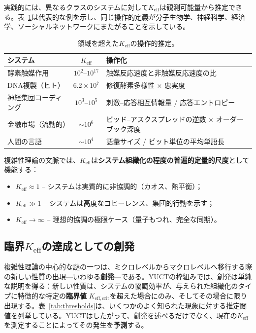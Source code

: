 \documentclass[11pt,a4paper]{article}
\theoremstyle{remark}
\newcommand{\Keff}{K_{\mathrm{eff}}}
\newcommand{\Keffcrit}{K_{\mathrm{eff},\text{crit}}}
\begin{document}
	実践的には、異なるクラスのシステムに対して\(\Keff\)は観測可能量から推定できる。表~\ref{tab:keff_examples}は代表的な例を示し、同じ操作的定義が分子生物学、神経科学、経済学、ソーシャルネットワークにまたがることを示している。
	
	\begin{table}[H]
		\centering
		\caption{領域を超えた\(\Keff\)の操作的推定。}
		\label{tab:keff_examples}
		\begin{tabular}{l c l}
			\toprule
			\textbf{システム} & \(\Keff\) & \textbf{操作化} \\
			\midrule
			酵素触媒作用 & \(10^2\)--\(10^{17}\) & 触媒反応速度と非触媒反応速度の比 \\
			DNA複製（ヒト） & \(6.2\times10^7\) & 修復酵素多様性 \(\times\) 忠実度 \\
			神経集団コーディング & \(10^3\)--\(10^5\) & 刺激–応答相互情報量 / 応答エントロピー \\
			金融市場（流動的） & \(\sim 10^6\) & ビッド–アスクスプレッドの逆数 \(\times\) オーダーブック深度 \\
			人間の言語 & \(\sim 10^4\) & 語彙サイズ / ビット単位の平均単語長 \\
			\bottomrule
		\end{tabular}
	\end{table}
	
	複雑性理論の文脈では、\(\Keff\)は\textbf{システム組織化の程度の普遍的定量的尺度}として機能する：
	\begin{itemize}
		\item \(\Keff \approx 1\) – システムは実質的に非協調的（カオス、熱平衡）；
		\item \(\Keff \gg 1\) – システムは高度なコヒーレンス、集団的行動を示す；
		\item \(\Keff \to \infty\) – 理想的協調の極限ケース（量子もつれ、完全な同期）。
	\end{itemize}
	
	\subsection{臨界\(\Keff\)の達成としての創発}
	
	複雑性理論の中心的な謎の一つは、ミクロレベルからマクロレベルへ移行する際の新しい性質の出現—いわゆる\textbf{創発}—である。YUCTの枠組みでは、創発は単純な説明を得る：新しい性質は、システムの協調効率が、与えられた組織化のタイプに特徴的な特定の\textbf{臨界値} \(\Keffcrit\)を超えた場合にのみ、そしてその場合に限り出現する。表~\ref{tab:thresholds}は、いくつかのよく知られた現象に対する推定閾値を列挙している。YUCTはしたがって、創発を述べるだけでなく、現在の\(\Keff\)を測定することによってその発生を\textbf{予測}する。
	
\end{document}
